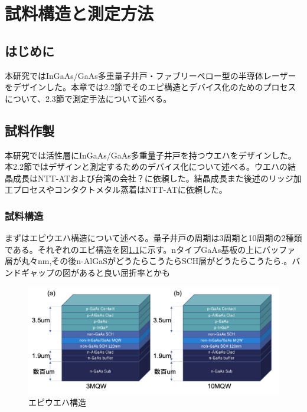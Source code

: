 
\chapter{試料構造と測定方法}%

\section{はじめに}%
本研究ではInGaAs/GaAs多重量子井戸・ファブリーペロー型の半導体レーザーをデザインした。本章では2.2節でそのエピ構造とデバイス化のためのプロセスについて、2.3節で測定手法について述べる。
\section{試料作製}%
本研究では活性層にInGaAs/GaAs多重量子井戸を持つウエハをデザインした。本2.2節ではデザインと測定するためのデバイス化について述べる。ウエハの結晶成長はNTT-ATおよび台湾の会社？に依頼した。結晶成長また後述のリッジ加工プロセスやコンタクトメタル蒸着はNTT-ATに依頼した。

\subsection{試料構造}%
まずはエピウエハ構造について述べる。量子井戸の周期は3周期と10周期の2種類である。それぞれのエピ構造を図\ref{fig:sample_structure}に示す。nタイプGaAs基板の上にバッファ層が丸々nm,その後n-AlGaSがどうたらこうたらSCH層がどうたらこうたら.。バンドギャップの図があると良い屈折率とかも
\begin{figure}[h]
	\centering
	\includegraphics[width=15cm]{figure/fig_sample_structure}
	\caption{エピウエハ構造}
	\label{fig:sample_structure}
\end{figure}

